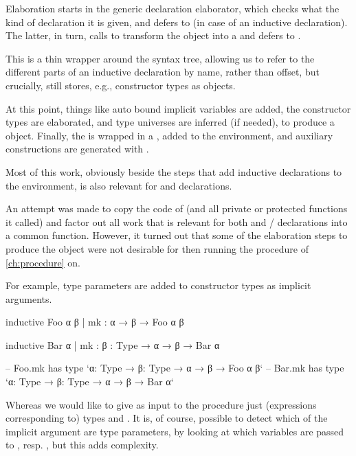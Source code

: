 Elaboration starts in the generic declaration elaborator, which checks what the kind of declaration it is given, and defers to  (in case of an inductive declaration). The latter, in turn, calls  to transform the  object into a  and defers to .

This  is a thin wrapper around the syntax tree, allowing us to refer to the different parts of an inductive declaration by name, rather than offset, but crucially, still stores, e.g., constructor types as  objects.

At this point, things like auto bound implicit variables are added, the constructor types are elaborated, and type universes are inferred (if needed), to produce a  object. 
Finally, the  is wrapped in a , added to the environment, and auxiliary constructions are generated with .


Most of this work, obviously beside the steps that add inductive declarations to the environment, is also relevant for \data{} and \codata{} declarations.

An attempt was made to copy the code of  (and all private or protected functions it called) and factor out all work that is relevant for both \inductive{} and \data{}/\codata{} declarations into a common function.
However, it turned out that some of the elaboration steps to produce the  object were not desirable for then running the procedure of \cref{ch:procedure} on.

For example, type parameters are added to constructor types as implicit arguments.
\begin{leancode}
    inductive Foo α β
      | mk : α → β → Foo α β

    inductive Bar α
      | mk : {β : Type} → α → β → Bar α

    -- Foo.mk has type `{α: Type} → {β: Type} → α → β → Foo α β`
    -- Bar.mk has type `{α: Type} → {β: Type} → α → β → Bar α`
\end{leancode}
Whereas we would like to give as input to the procedure just (expressions corresponding to) types  and .
It is, of course, possible to detect which of the implicit argument are type parameters, by looking at which variables are passed to , resp. , but this adds complexity.

